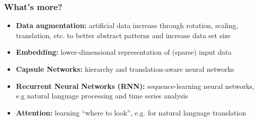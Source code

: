 \documentclass[aspectratio=169]{beamer}
\begin{document}
\begin{frame}
\frametitle{What's more?}

\begin{itemize}
    \item \textbf{Data augmentation:} artificial data increase through rotation, scaling,\\ translation, etc. to better abstract patterns and increase data set size
    \item \textbf{Embedding:} lower-dimensional representation of (sparse) input data
    \item \textbf{Capsule Networks:} hierarchy and translation-aware neural networks
    \item \textbf{Recurrent Neural Networks (RNN):} sequence-learning neural networks,\\ e.g natural language processing and time series analysis
    \item \textbf{Attention:} learning ``where to look'', e.g. for natural language translation
\end{itemize}
\end{frame}
\end{document}
